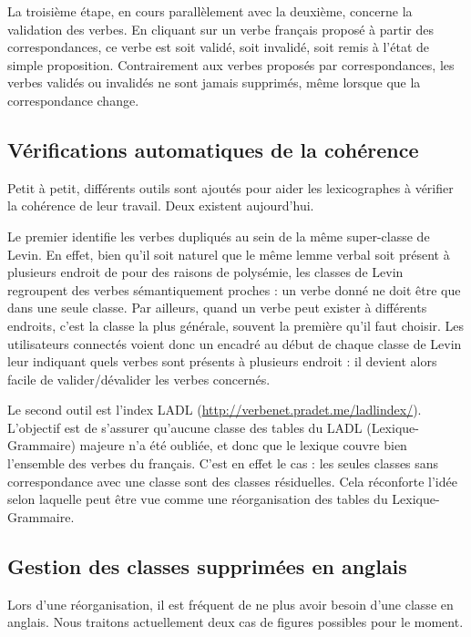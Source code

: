 La troisième étape, en cours parallèlement avec la deuxième, concerne la
validation des verbes. En cliquant sur un verbe français proposé à partir des
correspondances, ce verbe est soit validé, soit invalidé, soit remis à l'état
de simple proposition. Contrairement aux verbes proposés par correspondances,
les verbes validés ou invalidés ne sont jamais supprimés, même lorsque que la
correspondance change.

\subsection{Vérifications automatiques de la cohérence}

Petit à petit, différents outils sont ajoutés pour aider les lexicographes à
vérifier la cohérence de leur travail. Deux existent aujourd'hui.

Le premier identifie les verbes dupliqués au sein de la même super-classe de
Levin. En effet, bien qu'il soit naturel que le même lemme verbal soit présent
à plusieurs endroit de \verbenet{} pour des raisons de polysémie, les classes
de Levin regroupent des verbes sémantiquement proches : un verbe donné ne doit
être que dans une seule classe. Par ailleurs, quand un verbe peut exister à
différents endroits, c'est la classe la plus générale, souvent la première
qu'il faut choisir. Les utilisateurs connectés voient donc un encadré au début
de chaque classe de Levin leur indiquant quels verbes sont présents à plusieurs
endroit : il devient alors facile de valider/dévalider les verbes concernés.

Le second outil est l'index LADL (\url{http://verbenet.pradet.me/ladlindex/}).
L'objectif est de s'assurer qu'aucune classe des tables du LADL
(Lexique-Grammaire) majeure n'a été oubliée, et donc que le lexique couvre bien
l'ensemble des verbes du français. C'est en effet le cas : les seules classes
sans correspondance avec une classe \verbenet{} sont des classes résiduelles.
Cela réconforte l'idée selon laquelle \verbenet{} peut être vue comme une
réorganisation des tables du Lexique-Grammaire.

\subsection{Gestion des classes supprimées en anglais}

Lors d'une réorganisation, il est fréquent de ne plus avoir besoin d'une classe
en anglais. Nous traitons actuellement deux cas de figures possibles pour le
moment.

